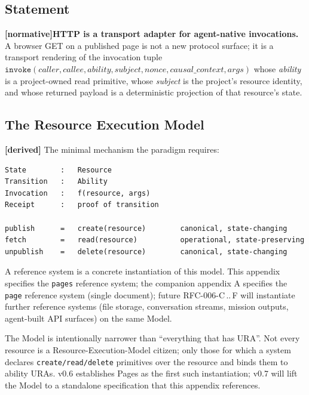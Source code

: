 \documentclass[11pt,a4paper]{article}
\newcommand{\normsv}{\textcolor{normativecolor}{\textbf{[normative]}}\xspace}
\newcommand{\derived}{\textcolor{derivedcolor}{\textbf{[derived]}}\xspace}
\theoremstyle{definition}
\begin{document}
\subsection{Statement}

\normsv{}\textbf{HTTP is a transport adapter for
agent-native invocations.} A browser GET on a published page is
not a new protocol surface; it is a transport rendering of the
invocation tuple
\(\texttt{invoke}(\textit{caller}, \textit{callee},
\textit{ability}, \textit{subject}, \textit{nonce},
\textit{causal\_context}, \textit{args})\) whose
\textit{ability} is a project-owned read primitive, whose
\textit{subject} is the project's resource identity, and whose
returned payload is a deterministic projection of that
resource's state.

\subsection{The Resource Execution Model}
\label{sec:rem}

\derived{} The minimal mechanism the paradigm requires:

\begin{lstlisting}
State        :   Resource
Transition   :   Ability
Invocation   :   f(resource, args)
Receipt      :   proof of transition

publish      =   create(resource)        canonical, state-changing
fetch        =   read(resource)          operational, state-preserving
unpublish    =   delete(resource)        canonical, state-changing
\end{lstlisting}

A reference system is a concrete instantiation of this model.
This appendix specifies the \texttt{pages} reference system; the
companion appendix A specifies the \texttt{page} reference
system (single document); future RFC-006-C\,..\,F will
instantiate further reference systems (file storage,
conversation streams, mission outputs, agent-built API surfaces)
on the same Model.

\begin{notebox}
The Model is intentionally narrower than ``everything that has
URA''. Not every resource is a Resource-Execution-Model citizen;
only those for which a system declares
\texttt{create/read/delete} primitives over the resource and
binds them to ability URAs. v0.6 establishes Pages as the first
such instantiation; v0.7 will lift the Model to a standalone
specification that this appendix references.
\end{notebox}
\end{document}
